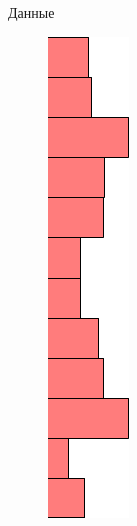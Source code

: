 \documentclass{beamer}
\begin{document}
\begin{frame}{Данные}
\begin{minipage}[t]{0.02\columnwidth}
\begin{figure}[h]
		\includegraphics[width=3.135\linewidth]{hist2.png}
	\end{figure}
\end{minipage}

\end{frame}
\end{document}

